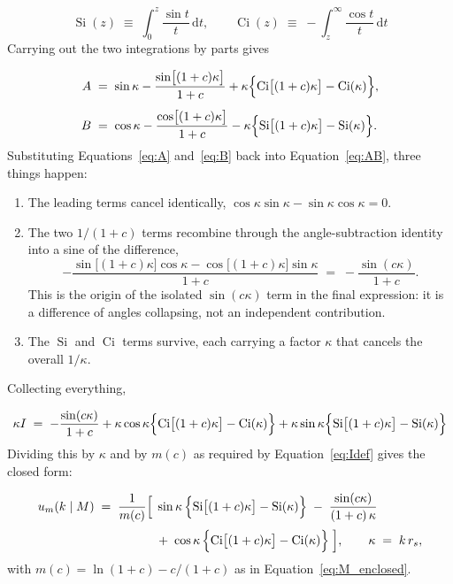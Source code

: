 \documentclass{article}
\newcommand{\dd}{\mathrm{d}}
\newcommand{\Si}{\operatorname{Si}}
\newcommand{\Ci}{\operatorname{Ci}}
\begin{document}
\begin{equation}
  \Si(z) \;\equiv\; \int_{0}^{z}\frac{\sin t}{t}\,\dd t,
  \qquad
  \Ci(z) \;\equiv\; -\int_{z}^{\infty}\frac{\cos t}{t}\,\dd t
  \label{eq:sici}
\end{equation}
Carrying out the two
integrations by parts gives
 
\begin{align}
  A &\;=\; \sin\kappa - \frac{\sin\bigl[(1+c)\kappa\bigr]}{1+c}
       + \kappa\Bigl\{\Ci\bigl[(1+c)\kappa\bigr]-\Ci(\kappa)\Bigr\},
  \label{eq:A} \\[1ex]
  B &\;=\; \cos\kappa - \frac{\cos\bigl[(1+c)\kappa\bigr]}{1+c}
       - \kappa\Bigl\{\Si\bigl[(1+c)\kappa\bigr]-\Si(\kappa)\Bigr\}.
  \label{eq:B}
\end{align}
Substituting Equations~\eqref{eq:A} and~\eqref{eq:B} back into Equation~\eqref{eq:AB},
three things happen:
 
\begin{enumerate}
  \item The leading terms cancel identically,
        $\cos\kappa\sin\kappa-\sin\kappa\cos\kappa=0$.
  \item The two $1/(1+c)$ terms recombine through the angle-subtraction
        identity into a sine of the difference,
        \begin{equation}
          -\frac{\sin\bigl[(1+c)\kappa\bigr]\cos\kappa
                 -\cos\bigl[(1+c)\kappa\bigr]\sin\kappa}{1+c}
          \;=\; -\frac{\sin(c\kappa)}{1+c}.
          \label{eq:collapse}
        \end{equation}
        This is the origin of the isolated $\sin(c\kappa)$ term in the final
        expression: it is a difference of angles collapsing, not an independent
        contribution.
  \item The $\Si$ and $\Ci$ terms survive, each carrying a factor $\kappa$ that
        cancels the overall $1/\kappa$.
\end{enumerate}
Collecting everything,
 
\[
  \kappa I \;=\; -\frac{\sin(c\kappa)}{1+c}
           + \kappa\cos\kappa\Bigl\{\Ci\bigl[(1+c)\kappa\bigr]-\Ci(\kappa)\Bigr\}
           + \kappa\sin\kappa\Bigl\{\Si\bigl[(1+c)\kappa\bigr]-\Si(\kappa)\Bigr\}
\]
Dividing this by $\kappa$ and by $m(c)$ as required by
Equation~\eqref{eq:Idef} gives the closed form:
 
\begin{equation}
  \begin{aligned}
  u_m(k\mid M) \;=\; \frac{1}{m(c)}
    \Bigl[\;
      &\sin\kappa\,\Bigl\{\Si\bigl[(1+c)\kappa\bigr]-\Si(\kappa)\Bigr\}
      \;-\;\frac{\sin(c\kappa)}{(1+c)\,\kappa} \\[0.5ex]
      &+\;\cos\kappa\,\Bigl\{\Ci\bigl[(1+c)\kappa\bigr]-\Ci(\kappa)\Bigr\}
    \;\Bigr],
  \qquad \kappa \;=\; k\,r_s,
  \end{aligned}
  \label{eq:result}
\end{equation}
with $m(c)=\ln(1+c)-c/(1+c)$ as in Equation~\eqref{eq:M_enclosed}.
\end{document}
